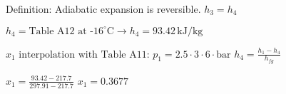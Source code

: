 Definition: Adiabatic expansion is reversible.  
\( h_3 = h_4 \)  

\( h_4 = \text{Table A12 at -16}^\circ \text{C} \rightarrow h_4 = 93.42 \, \text{kJ/kg} \)  

\( x_1 \text{ interpolation with Table A11} \):  
\( p_1 = 2.5 \cdot 3 \cdot 6 \cdot \text{bar} \)  
\( h_4 = \frac{h_1 - h_4}{h_{fg}} \)  

\( x_1 = \frac{93.42 - 217.7}{297.91 - 217.7} \)  
\( x_1 = 0.3677 \)